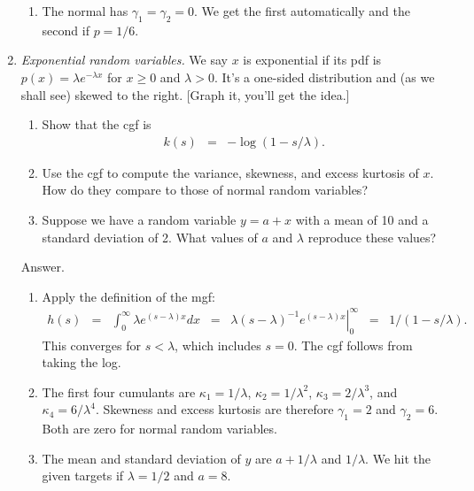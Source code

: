 \begin{enumerate}
\begin{enumerate}
\item The normal has $\gamma_1 = \gamma_2 = 0$.
We get the first automatically and the second if $p = 1/6$.
\end{enumerate}


\item {\it Exponential random variables.\/}
We say $x$ is exponential if its pdf is
$ %
    p(x) = \lambda e^{-\lambda x}
$ %
for $x \geq 0$ and $\lambda > 0$.
It's a one-sided distribution and (as we shall see) skewed to the right.
[Graph it, you'll get the idea.]
%
\begin{enumerate}
\item Show that the cgf is
\begin{eqnarray*}
    k(s)  &=& - \log \left( 1 - s/\lambda \right) .
\end{eqnarray*}
\item Use the cgf to compute the variance, skewness, and excess kurtosis
of $x$.  How do they compare to those of normal random variables?
\item Suppose we have a random variable $ y = a + x$
with  a mean of 10 and a standard deviation of 2.
What values of $a$ and $\lambda$ reproduce these values?
\end{enumerate}

Answer.
\begin{enumerate}
\item Apply the definition of the mgf:
\begin{eqnarray*}
    h(s) &=& \int_{0}^{\infty} \lambda e^{(s-\lambda)x} dx
            \;\;=\;\; \left. \lambda (s-\lambda)^{-1} e^{(s-\lambda)x} \right|_0^\infty
            \;\;=\;\; 1/(1-s/\lambda) .
\end{eqnarray*}
This converges for $s<\lambda$, which includes $s=0$.
The cgf follows from taking the log.
\item The first four cumulants are
$\kappa_1 = 1/\lambda$,
$\kappa_2 = 1/\lambda^2$,
$\kappa_3 = 2/\lambda^3$,
and $\kappa_4 = 6/\lambda^4$.
Skewness and excess kurtosis are therefore
$\gamma_1 = 2$ and $\gamma_2 = 6$.
Both are zero for normal random variables.

\item The mean and standard deviation of $y$ are
$ a + 1/\lambda $ and $1/\lambda$.
We hit the given targets if $\lambda = 1/2 $ and $ a = 8$.
\end{enumerate}


\end{enumerate}
